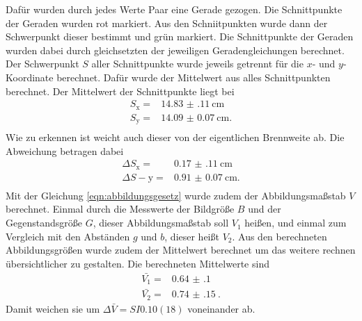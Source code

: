 Dafür wurden durch jedes Werte Paar eine Gerade gezogen.
Die Schnittpunkte der Geraden wurden rot markiert.
Aus den Schniitpunkten wurde dann der Schwerpunkt dieser bestimmt und grün markiert.
Die Schnittpunkte der Geraden wurden dabei durch gleichsetzten der jeweiligen Geradengleichungen berechnet.
Der Schwerpunkt $S$ aller Schnittpunkte wurde jeweils getrennt für die $x$- und $y$-Koordinate berechnet.
Dafür wurde der Mittelwert aus alles Schnittpunkten berechnet.
Der Mittelwert der Schnittpunkte liegt bei 
\begin{align*}
    S_\text{x} = & \SI{14.83(11)}{\centi\meter}\\
    S_\text{y} = & \SI{14.09(7)}{\centi\meter}. \\
\end{align*}
Wie zu erkennen ist weicht auch dieser von der eigentlichen Brennweite ab.
Die Abweichung betragen dabei 
\begin{align*}
   \Delta S_\text{x} = & \SI{0.17(11)}{\centi\meter} \\
    \Delta S-\text{y} = & \SI{0.91(7)}{\centi\meter}. \\
\end{align*}
Mit der Gleichung \eqref{eqn:abbildungsgesetz} wurde zudem der Abbildungsmaßstab $V$ berechnet.
Einmal durch die Messwerte der Bildgröße $B$ und der Gegenstandsgröße $G$, dieser Abbildungsmaßstab soll $V_1$ heißen, und einmal zum Vergleich mit den Abständen $g$ und $b$, dieser heißt $V_2$.
Aus den berechneten Abbildungsgrößen wurde zudem der Mittelwert berechnet um das weitere rechnen übersichtlicher zu gestalten.
Die berechneten Mittelwerte sind 
\begin{align*}
    \bar{V_1} = & \SI{0.64(10)}{}\\
    \bar{V_2} = & \SI{0.74(15)}{}.
\end{align*}
Damit weichen sie um $\Delta \bar{V} = SI{0.10(18)}{}$ voneinander ab.

